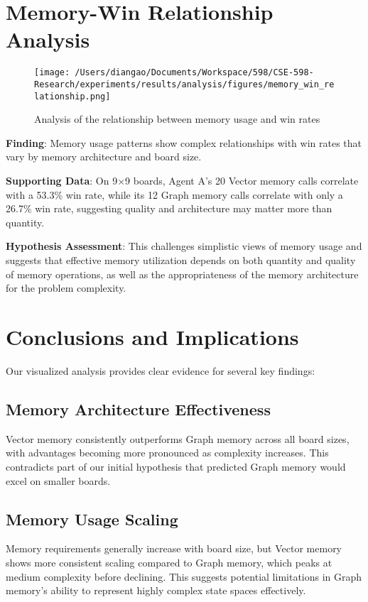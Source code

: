 \documentclass[10pt]{article}
\begin{document}
\section{Memory-Win Relationship Analysis}

\begin{figure}[t]
    \centering
    \texttt{[image: /Users/diangao/Documents/Workspace/598/CSE-598-Research/experiments/results/analysis/figures/memory\_win\_relationship.png]}
    \caption{Analysis of the relationship between memory usage and win rates}
    \label{fig:memory_win}
\end{figure}

\small
\textbf{Finding}: Memory usage patterns show complex relationships with win rates that vary by memory architecture and board size.

\textbf{Supporting Data}: On 9×9 boards, Agent A's 20 Vector memory calls correlate with a 53.3\% win rate, while its 12 Graph memory calls correlate with only a 26.7\% win rate, suggesting quality and architecture may matter more than quantity.

\textbf{Hypothesis Assessment}: This challenges simplistic views of memory usage and suggests that effective memory utilization depends on both quantity and quality of memory operations, as well as the appropriateness of the memory architecture for the problem complexity.

\section{Conclusions and Implications}
\small
Our visualized analysis provides clear evidence for several key findings:

\subsection{Memory Architecture Effectiveness}
Vector memory consistently outperforms Graph memory across all board sizes, with advantages becoming more pronounced as complexity increases. This contradicts part of our initial hypothesis that predicted Graph memory would excel on smaller boards.

\subsection{Memory Usage Scaling}
Memory requirements generally increase with board size, but Vector memory shows more consistent scaling compared to Graph memory, which peaks at medium complexity before declining. This suggests potential limitations in Graph memory's ability to represent highly complex state spaces effectively.
\end{document}

